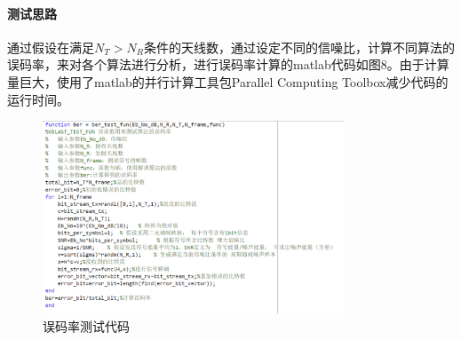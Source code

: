\documentclass[a4paper,12pt]{article}
\begin{document}
	\paragraph{测试思路}
	通过假设在满足$N_T>N_R$条件的天线数，通过设定不同的信噪比，计算不同算法的误码率，来对各个算法进行分析，进行误码率计算的matlab代码如图8。由于计算量巨大，使用了matlab的并行计算工具包Parallel Computing Toolbox减少代码的运行时间。\par 
	\begin{figure}[h]
		\centering
		\includegraphics[width=0.8\textwidth]{8.png}
		\caption{误码率测试代码}
	\end{figure}
\end{document}

